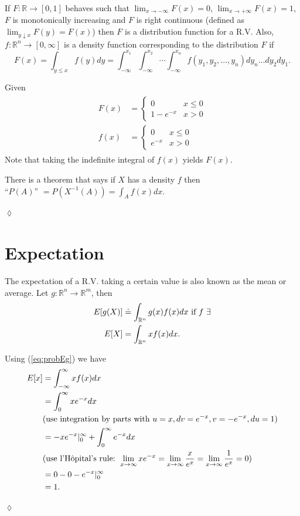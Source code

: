 If $F: \mathbb{R} \to [0,1]$ behaves such that $\lim_{x \to -\infty} F(x) = 0$, $\lim_{x \to +\infty} F(x) = 1$, $F$ is monotonically increasing and $F$ is right continuous (defined as $\lim_{y \downarrow x} F(y) = F(x)$) then $F$ is a distribution function for a R.V. Also, $f:\mathbb{R}^n \to [0,\infty]$ is a density function corresponding to the distribution $F$ if
$$F(x) = \int_{y \leq x} f(y)dy = \int_{-\infty}^{x_1} \int_{-\infty}^{x_2}\cdots \int_{-\infty}^{x_n} f(y_1,y_2,\ldots,y_n)dy_n\ldots dy_2dy_1.$$

\begin{example}
Given
\begin{align}
\label{eq:probEg}
\begin{split}
F(x) &= \begin{cases} 0 & x \leq 0 \\ 1-e^{-x} & x > 0 \end{cases} \\
f(x) &= \begin{cases} 0 & x \leq 0 \\ e^{-x} & x > 0 \end{cases}
\end{split}
\end{align}
Note that taking the indefinite integral of $f(x)$ yields $F(x)$.

There is a theorem that says if $X$ has a density $f$ then \\
``$P(A)$'' $= P\left(X^{-1}(A)\right) = \int_A f(x)dx$.
\end{example}
$\lozenge$

\section{Expectation}
The expectation of a R.V. taking a certain value is also known as the mean or average. Let $g: \mathbb{R}^n \to \mathbb{R}^m$, then
\begin{align*}
E[g(X)] &\doteq \int_{\mathbb{R}^n} g(x)f(x)dx \textnormal{ if } f ~ \exists \\
E[X] &= \int_{\mathbb{R}^n}xf(x)dx.
\end{align*}

\begin{example}
Using (\ref{eq:probEg}) we have
\begin{align*}
E[x] &= \int_{-\infty}^\infty xf(x)dx \\
&= \int_0^\infty xe^{-x}dx \\
&(\textnormal{use integration by parts with } u = x, dv = e^{-x}, v = -e^{-x}, du = 1) \\
&= -xe^{-x}\rvert_0^\infty + \int_0^\infty e^{-x}dx \\
&(\textnormal{use l'H\^opital's rule: } \lim_{x \to \infty} xe^{-x} = \lim_{x \to \infty} \frac{x}{e^x} = \lim_{x \to \infty} \frac{1}{e^x} = 0) \\
&= 0 - 0 - e^{-x}\rvert_0^\infty \\
&= 1.
\end{align*}
\end{example}
$\lozenge$

